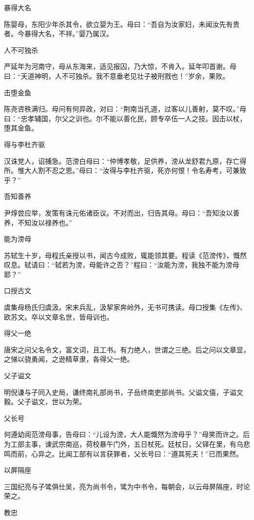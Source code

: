 \documentclass[a4paper,12pt,UTF8,twoside]{ctexbook}
\begin{document}
    暴得大名
    
    陈婴母，东阳少年杀其令，欲立婴为王。母曰：“吾自为汝家妇，未闻汝先有贵者。今暴得大名，不祥。”婴乃属汉。
    
    人不可独杀
    
    严延年为河南守，母从东海来，适见报囚，乃大惊，不肯入。延年叩首谢。母曰：“天道神明，人不可独杀。我不意垂老见壮子被刑戮也！”岁余，果败。
    
    击堕金鱼
    
    陈尧咨秩满归。母问有何异政，对曰：“荆南当孔道，过客以儿善射，莫不叹。”母曰：“忠孝辅国，尔父之训也。尔不能以善化民，顾专卒伍一人之技。因击以杖，堕其金鱼。
    
    得与李杜齐驱
    
    汉诛党人，诏捕急。范滂白母曰：“仲博孝敬，足供养，滂从龙舒君九原，存亡得所。惟大人割不忍之恩。”母曰：“汝得与李杜齐驱，死亦何恨！令名寿考，可兼致乎？”
    
    吾知善养
    
    尹焞尝应举，发策有诛元佑诸臣议。不对而出，归告其母。母曰：“吾知汝以善养，不知汝以禄养也。”
    
    能为滂母
    
    苏轼生十岁，母程氏亲授以书，闻古今成败，辄能领其要。程读《范滂传》，慨然叹息。轼请曰：“轼若为滂，母能许之否？”程曰：“汝能为滂，我独不能为滂母耶？”
    
    口授古文
    
    虞集母杨氏归虞汲。宋末兵乱，汲挈家奔岭外，无书可携读。母口授集《左传》、欧苏文。卒以文章名世，皆母训也。
    
    得父一绝
    
    唐宋之问父名令文，富文词，且工书。有力绝人，世谓之三绝。后之问以文章显，之悌以骁勇闻，之逊精草隶，各得父一绝。
    
    父子谥文
    
    明倪谦与子同入史局，谦终南礼部尚书，子岳终南吏部尚书。父谥文僖，子谥文毅。父子谥文，世以为荣。
    
    父长号
    
    何遵幼阅范滂母事，告母曰：“儿设为滂，大人能慨然为滂母乎？”母笑而许之。后为工部主事，谏武宗南巡，荷校暴午门外，五日杖死。廷杖日，父铎在里，有乌悲鸣而前，心异之。比闻工部有以言获罪者，父长号曰：“遵其死夫！”已而果然。
    
    以屏隔座
    
    三国纪亮与子骘俱仕吴，亮为尚书令，骘为中书令，每朝会，以云母屏隔座，时论荣之。
    
    教忠
    
\end{document}
